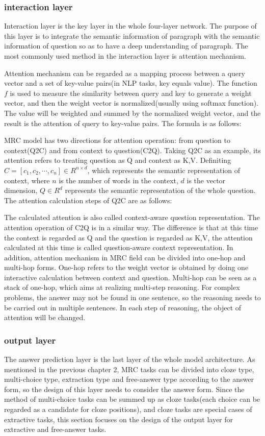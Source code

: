 \subsubsection{interaction layer}
Interaction layer is the key layer in the whole four-layer network. The purpose of this layer is to integrate the semantic information of paragraph with the semantic 
information of question so as to have a deep understanding of paragraph. The most commonly used method in the interaction layer is attention mechanism.

Attention mechanism can be regarded as a mapping process between a query vector and a set of key-value pairs(in NLP tasks, key equals value). The function $f$ is 
used to measure the similarity between query and key to generate a weight vector, and then the weight vector is normalized(usually using softmax function). The value will be 
weighted and summed by the normalized weight vector, and the result is the attention of query to key-value pairs. The formula is as follows: 

MRC model has two directions for attention operation: from question to context(Q2C) and from context to question(C2Q). Taking Q2C as an example, 
its attention refers to treating question as Q and context as K,V. Definiting $C=[c_1,c_2,\cdots,c_n]\in R^{n\times d}$, 
which represents the semantic representation of context, where $n$ is the number of 
words in the context, $d$ is the vector dimension, $Q\in R^d$ represents the semantic representation of the whole question. 
The attention calculation steps of Q2C are as follows:

The calculated attention is also called context-aware question representation. The attention operation of C2Q is in a similar way. The difference is that 
at this time the context is regarded as Q and the question is regarded as K,V, the attention calculated at this time is called question-aware context representation.
In addition, attention mechanism in MRC field can be divided into one-hop and multi-hop forms. One-hop refers to the weight vector is obtained by doing one interactive calculation 
between context and question. Multi-hop can be seen as a stack of one-hop, which aims at realizing multi-step reasoning. For complex problems, 
the answer may not be found in one sentence, so the reasoning needs to be carried out in multiple sentences. In each step of reasoning, the object of attention will be changed. 

\subsubsection{output layer}
The answer prediction layer is the last layer of the whole model architecture. As mentioned in the previous chapter 2, MRC tasks can be 
divided into cloze type, multi-choice type, extraction type and free-answer type according to the answer form, so the design of this layer needs to consider 
the answer form. Since the method of multi-choice tasks can be summed up as cloze tasks(each choice can be regarded as a candidate for cloze positions), and cloze tasks 
are special cases of extractive tasks, this section focuses on the design of the output layer for extractive and free-answer tasks.

